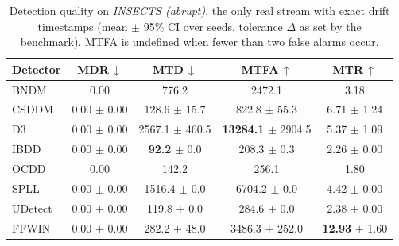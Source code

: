 \begin{table}[!t]
\centering
\caption{Detection quality on \textit{INSECTS (abrupt)}, the only real stream with exact drift timestamps (mean $\pm$ 95\% CI over seeds, tolerance $\Delta$ as set by the benchmark). MTFA is undefined when fewer than two false alarms occur.}
\label{tab:insects_gt}
\footnotesize
\setlength{\tabcolsep}{5pt}
\begin{tabular}{@{}lcccc@{}}
\toprule
\textbf{Detector} & \textbf{MDR}\,$\downarrow$ & \textbf{MTD}\,$\downarrow$ & \textbf{MTFA}\,$\uparrow$ & \textbf{MTR}\,$\uparrow$ \\
\midrule
BNDM & 0.00 & 776.2 & 2472.1 & 3.18 \\
CSDDM & 0.00 $\pm$ 0.00 & 128.6 $\pm$ 15.7 & 822.8 $\pm$ 55.3 & 6.71 $\pm$ 1.24 \\
D3 & 0.00 $\pm$ 0.00 & 2567.1 $\pm$ 460.5 & \textbf{13284.1} $\pm$ 2904.5 & 5.37 $\pm$ 1.09 \\
IBDD & 0.00 $\pm$ 0.00 & \textbf{92.2} $\pm$ 0.0 & 208.3 $\pm$ 0.3 & 2.26 $\pm$ 0.00 \\
OCDD & 0.00 & 142.2 & 256.1 & 1.80 \\
SPLL & 0.00 $\pm$ 0.00 & 1516.4 $\pm$ 0.0 & 6704.2 $\pm$ 0.0 & 4.42 $\pm$ 0.00 \\
UDetect & 0.00 $\pm$ 0.00 & 119.8 $\pm$ 0.0 & 284.6 $\pm$ 0.0 & 2.38 $\pm$ 0.00 \\
FFWIN & 0.00 $\pm$ 0.00 & 282.2 $\pm$ 48.0 & 3486.3 $\pm$ 252.0 & \textbf{12.93} $\pm$ 1.60 \\
\bottomrule
\end{tabular}
\end{table}

